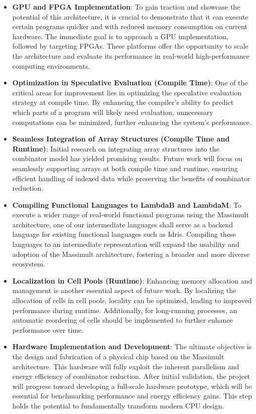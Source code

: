 \documentclass{IEEEtran}
\begin{document}
\begin{itemize}
    \item \textbf{GPU and FPGA Implementation}: To gain traction and showcase the potential of this architecture, it is crucial to demonstrate that it can execute certain programs quicker and with reduced memory consumption on current hardware. The immediate goal is to approach a GPU implementation, followed by targeting FPGAs. These platforms offer the opportunity to scale the architecture and evaluate its performance in real-world high-performance computing environments.

    \item \textbf{Optimization in Speculative Evaluation (Compile Time)}: One of the critical areas for improvement lies in optimizing the speculative evaluation strategy at compile time. By enhancing the compiler's ability to predict which parts of a program will likely need evaluation, unnecessary computations can be minimized, further enhancing the system's performance.

    \item \textbf{Seamless Integration of Array Structures (Compile Time and Runtime)}: Initial research on integrating array structures into the combinator model has yielded promising results. Future work will focus on seamlessly supporting arrays at both compile time and runtime, ensuring efficient handling of indexed data while preserving the benefits of combinator reduction.

    \item \textbf{Compiling Functional Languages to LambdaB and LambdaM}: To execute a wider range of real-world functional programs using the Massimult architecture, one of our intermediate languages shall serve as a backend language for existing functional languages such as Idris. Compiling these languages to an intermediate representation will expand the usability and adoption of the Massimult architecture, fostering a broader and more diverse ecosystem.

    \item \textbf{Localization in Cell Pools (Runtime)}: Enhancing memory allocation and management is another essential aspect of future work. By localizing the allocation of cells in cell pools, locality can be optimized, leading to improved performance during runtime. Additionally, for long-running processes, an automatic reordering of cells should be implemented to further enhance performance over time.

    \item \textbf{Hardware Implementation and Development}: The ultimate objective is the design and fabrication of a physical chip based on the Massimult architecture. This hardware will fully exploit the inherent parallelism and energy efficiency of combinator reduction. After initial validation, the project will progress toward developing a full-scale hardware prototype, which will be essential for benchmarking performance and energy efficiency gains. This step holds the potential to fundamentally transform modern CPU design.
\end{itemize}
\end{document}
